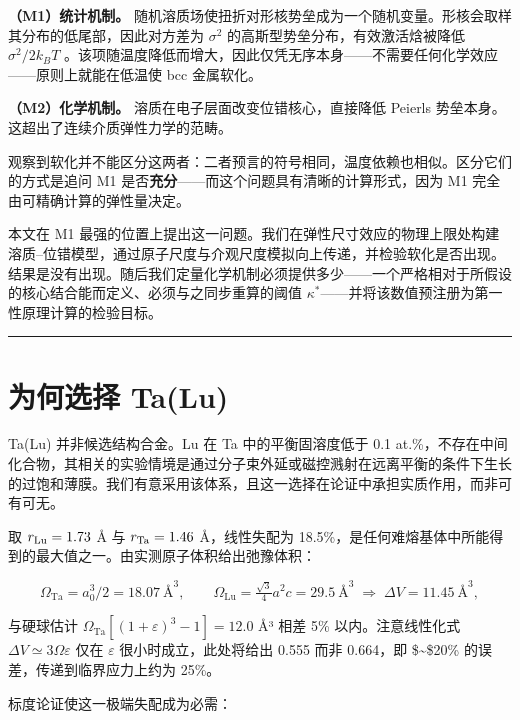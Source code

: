 \textbf{（M1）统计机制。} 随机溶质场使扭折对形核势垒成为一个随机变量。形核会取样其分布的低尾部，因此对方差为 \(\sigma^2\) 的高斯型势垒分布，有效激活焓被降低 \(\sigma^2/2k_BT\) \cite{labusch1970,kocks1975}。该项随温度降低而增大，因此仅凭无序本身------不需要任何化学效应------原则上就能在低温使 bcc 金属软化。

\textbf{（M2）化学机制。} 溶质在电子层面改变位错核心，直接降低 Peierls 势垒本身。这超出了连续介质弹性力学的范畴。

观察到软化并不能区分这两者：二者预言的符号相同，温度依赖也相似。区分它们的方式是追问 M1 是否\textbf{充分}------而这个问题具有清晰的计算形式，因为 M1 完全由可精确计算的弹性量决定。

本文在 M1 最强的位置上提出这一问题。我们在弹性尺寸效应的物理上限处构建溶质--位错模型，通过原子尺度与介观尺度模拟向上传递，并检验软化是否出现。结果是没有出现。随后我们定量化学机制必须提供多少------一个严格相对于所假设的核心结合能而定义、必须与之同步重算的阈值 \(\kappa^*\)------并将该数值预注册为第一性原理计算的检验目标。

\begin{center}\rule{0.5\linewidth}{0.5pt}\end{center}

\hypertarget{ux4e3aux4f55ux9009ux62e9-talu}{%
\section{为何选择 Ta(Lu)}\label{sec:ux4e3aux4f55ux9009ux62e9-talu}}

Ta(Lu) 并非候选结构合金。Lu 在 Ta 中的平衡固溶度低于 0.1 at.\%，不存在中间化合物，其相关的实验情境是通过分子束外延或磁控溅射在远离平衡的条件下生长的过饱和薄膜。我们有意采用该体系，且这一选择在论证中承担实质作用，而非可有可无。

取 \(r_{\rm Lu} = 1.73\) Å 与 \(r_{\rm Ta} = 1.46\) Å，线性失配为 18.5\%，是任何难熔基体中所能得到的最大值之一。由实测原子体积给出弛豫体积：

\[\Omega_{\mathrm{Ta}} = a_0^3/2 = 18.07\ \text{\AA}^3,\qquad \Omega_{\mathrm{Lu}} = \tfrac{\sqrt{3}}{4}a^2c = 29.5\ \text{\AA}^3 \;\Longrightarrow\; \Delta V = 11.45\ \text{\AA}^3,\]

与硬球估计 \(\Omega_{\mathrm{Ta}}[(1+\varepsilon)^3-1] = 12.0\) Å³ 相差 5\% 以内。注意线性化式 \(\Delta V \simeq 3\Omega\varepsilon\) 仅在 \(\varepsilon\) 很小时成立，此处将给出 0.555 而非 0.664，即 \$\sim\$20\% 的误差，传递到临界应力上约为 25\%。

标度论证使这一极端失配成为必需：

